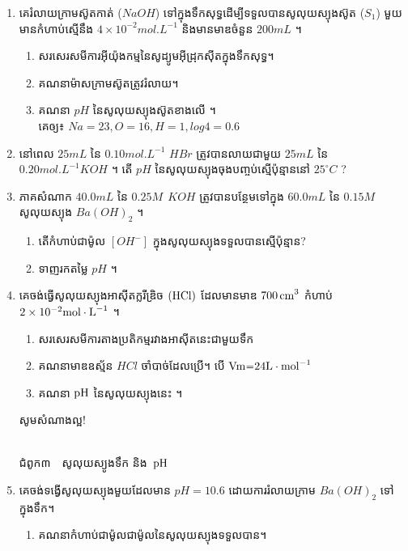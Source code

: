 \documentclass[12pt, a4paper]{article}
\begin{document}
\begin{enumerate}[m]
\begin{enumerate}[k]
	\end{enumerate}  
	\item គេរំលាយក្រាមស៊ូតកាត់ ($NaOH$) ទៅក្នុងទឹកសុទ្ធដើម្បីទទួលបានសូលុយស្យុងស៊ូត ($S_1$) មួយមានកំហាប់ស្មើនឹង $4\times10^{-2}mol.L^{-1}$ និងមានមាឌចំនួន $200mL$ ។
	\begin{enumerate}[k]
		\item សរសេរសមីការអ៊ីយ៉ុងកម្មនៃសូដ្យូមអ៊ីដ្រុកស៊ីតក្នុងទឹកសុទ្ធ។
		\item គណនាម៉ាសក្រាមស៊ូតត្រូវរំលាយ។
		\item គណនា $pH$ នៃសូលុយស្យុងស៊ូតខាងលើ ។ \\គេឲ្យ៖ $Na=23, O=16, H=1, log4=0.6$
	\end{enumerate}
	\item នៅពេល $25 mL$ នៃ $0.10mol.L^{-1}$ $HBr$ ត្រូវបានលាយជាមួយ $25mL$ នៃ $0.20mol.L^{-1} KOH$ ។ តើ $pH$ នៃសូលុយស្យុងចុងបញ្ចប់ស្មើប៉ុន្មាននៅ $25^\circ C$ ?
	\item ភាគសំណាក $40.0mL$ នៃ $0.25M~~KOH$ ត្រូវបានបន្ថែមទៅក្នុង $60.0mL$ នៃ $0.15 M$ សូលុយស្យុង $Ba(OH)_2$ ។
	\begin{enumerate}[k]
		\item តើកំហាប់ជាម៉ូល $[OH^-]$ ក្នុងសូលុយស្យុងទទួលបានស្មើប៉ុន្មាន?
		\item ទាញរកតម្លៃ $pH$ ។
	\end{enumerate}
	\item គេចង់ធ្វើសូលុយស្យុងអាសុីតក្លរីឌ្រិច $\ce{(HCl)}$ ដែលមានមាឌ $\ce{700cm^3}$ កំហាប់ $2 \times 10^{-2} \ce{mol\cdot L^{-1}}$ ។
	\begin{enumerate}[k]
		\item សរសេរសមីការតាងប្រតិកម្មរវាងអាសុីតនេះជាមួយទឹក
		\item គណនាមាឌឧស្ម័ន $HCl$ ចាំបាច់ដែលប្រើ។ បើ $\ce{Vm=24 L\cdot mol^{-1}}$
		\item គណនា $\ce{pH}$ នៃសូលុយស្យុងនេះ ។
	\end{enumerate}
	\begin{center}
		\sffamily\color{black}
		សូមសំណាងល្អ!
	\end{center}\newpage
	\begin{center}
		\sffamily\color{black}
		\\
		ជំពូក៣~~សូលុយស្យូងទឹក និង~$\ce{pH}$
	\end{center}
	\item គេចង់ទង្វើសូលុយស្យុងមួយដែលមាន $pH=10.6$ ដោយការរំលាយក្រាម $Ba\left(OH\right)_{2}$ ទៅក្នុងទឹក។
	\begin{enumerate}[k]
		\item គណនាកំហាប់ជាម៉ូលជាម៉ូលនៃសូលុយស្យុងទទួលបាន។

\end{enumerate}
\end{enumerate}
\end{document}

